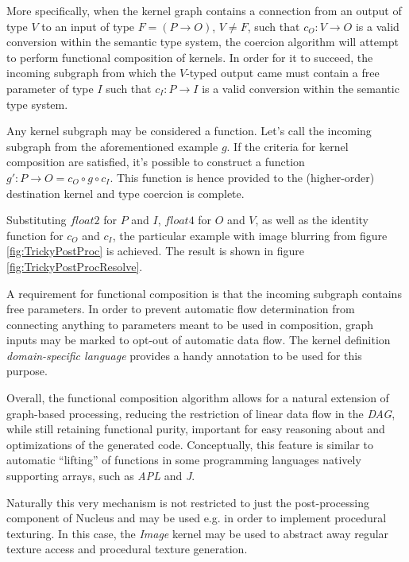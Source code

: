 More specifically, when the kernel graph contains a connection from an output of type $V$ to an input of type $F = (P \rightarrow O)$, $V \neq F$, such that $c_O : V \rightarrow O$ is a valid conversion within the semantic type system, the coercion algorithm will attempt to perform functional composition of kernels. In order for it to succeed, the incoming subgraph from which the $V$-typed output came must contain a free parameter of type $I$ such that $c_I : P \rightarrow I$ is a valid conversion within the semantic type system.

Any kernel subgraph may be considered a function. Let's call the incoming subgraph from the aforementioned example $g$. If the criteria for kernel composition are satisfied, it's possible to construct a function $g\prime : P \rightarrow O = c_O \circ g \circ c_I$. This function is hence provided to the (higher-order) destination kernel and type coercion is complete.

Substituting $float2$ for $P$ and $I$, $float4$ for $O$ and $V$, as well as the identity function for $c_O$ and $c_I$, the particular example with image blurring from figure \ref{fig:TrickyPostProc} is achieved. The result is shown in figure \ref{fig:TrickyPostProcResolve}.

A requirement for functional composition is that the incoming subgraph contains free parameters. In order to prevent automatic flow determination from connecting anything to parameters meant to be used in composition, graph inputs may be marked to opt-out of automatic data flow. The kernel definition \emph{domain-specific language} provides a handy annotation to be used for this purpose.


Overall, the functional composition algorithm allows for a natural extension of graph-based processing, reducing the restriction of linear data flow in the \emph{DAG}, while still retaining functional purity, important for easy reasoning about and optimizations of the generated code. Conceptually, this feature is similar to automatic ``lifting'' of functions in some programming languages natively supporting arrays, such as \emph{APL} and \emph{J}.

Naturally this very mechanism is not restricted to just the post-processing component of Nucleus and may be used e.g. in order to implement procedural texturing. In this case, the \emph{Image} kernel may be used to abstract away regular texture access and procedural texture generation.
	
